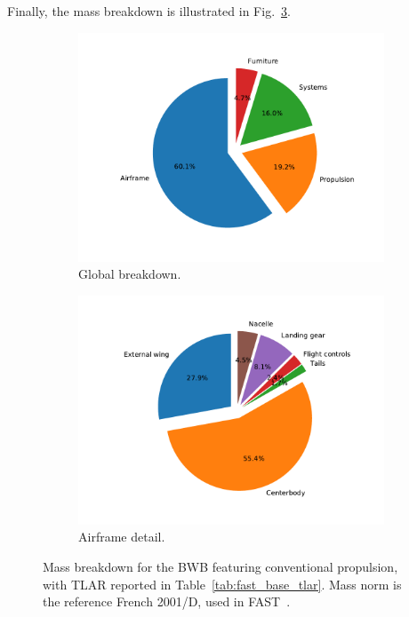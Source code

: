 Finally, the mass breakdown is illustrated in Fig.~\ref{fig:bwb_conv_mb}.
\begin{figure}[!h]
	\centering
	\begin{subfigure}{0.45\textwidth}
		\centering
		\includegraphics[keepaspectratio, width=\linewidth]{images/chap4/bwb_conv_mb}
		\caption{Global breakdown.}
		\label{fig:bwb_conv_mb_global}
	\end{subfigure}
	\begin{subfigure}{0.45\textwidth}
		\centering
		\includegraphics[keepaspectratio, width=\linewidth]{images/chap4/bwb_conv_airframe_mb}
		\caption{Airframe detail.}
		\label{fig:bwb_conv_mb_detail_airframe}
	\end{subfigure}
	\caption{Mass breakdown for the BWB featuring conventional propulsion, with TLAR reported in Table~\ref{tab:fast_base_tlar}. Mass norm is the reference French 2001/D, used in FAST~\cite{bib:mass_breakdown}.}
	\label{fig:bwb_conv_mb}
\end{figure}
